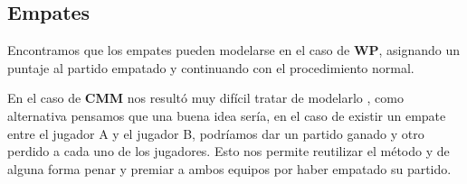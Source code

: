 \subsection{Empates}

Encontramos que los empates pueden modelarse en el caso de \textbf{WP}, asignando un puntaje al partido empatado y continuando con el procedimiento normal.

En el caso de \textbf{CMM} nos resultó muy difícil tratar de modelarlo , como alternativa pensamos que una buena idea sería, en el caso de existir un empate entre el 
jugador A y el jugador B, podríamos dar un partido ganado y otro perdido a cada uno de los jugadores. 
Esto nos permite reutilizar el método y de alguna forma penar y premiar a ambos equipos por haber empatado su partido.